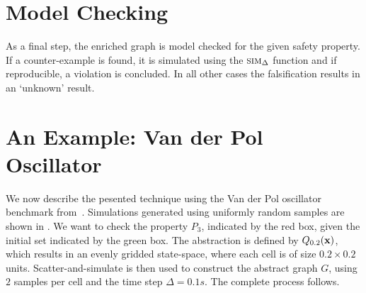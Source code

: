 \section{Model Checking}

As a final step, the enriched graph is model checked for the given
safety property. If a counter-example is found, it is simulated using
the $\mbox{\sc sim}_\Delta$ function and if reproducible, a violation is
concluded. In all other cases the falsification results in an
`unknown' result.


\section{An Example: Van der Pol Oscillator}

We now describe the pesented technique using the Van der Pol
oscillator benchmark from~\cite{zutshi2014multiple}. Simulations
generated using uniformly random samples are shown in
. We want to check the property $P_3$, indicated by
the red box, given the initial set indicated by the green box. The
abstraction is defined by $Q_{0.2}(\mathbf{x})$, which results in an
evenly gridded state-space, where each cell is of size $0.2 \times
0.2$ units.  Scatter-and-simulate is then used to construct the
abstract graph $G$, using $2$ samples per cell and the time step
$\Delta = 0.1s$. The complete process follows.

